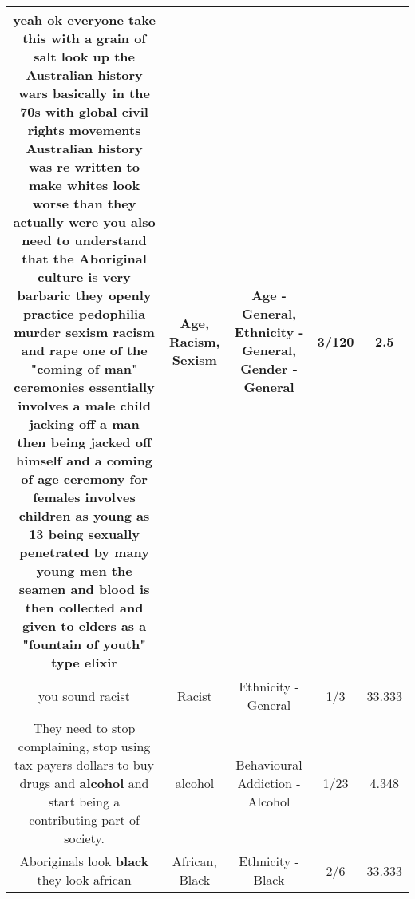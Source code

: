 \documentclass[11pt]{article}
\newlength\mylength
\begin{document}
\begin{center}
\begin{longtable}{|C{.65\mylength}|C{.30\mylength}|C{.12\mylength}|C{.12\mylength}|C{.12\mylength}|}
  \small yeah ok everyone take this with a grain of salt look up the Australian history wars basically in the 70s with global civil rights movements Australian history was re written to make whites look worse than they actually were you also need to understand that the Aboriginal culture is very barbaric they openly practice pedophilia murder \textbf{sexism} \textbf{racism} and rape one of the "coming of man" ceremonies essentially involves a male child jacking off a man then being jacked off himself and a coming of \textbf{age} ceremony for females involves children as young as 13 being sexually penetrated by many young men the seamen and blood is then collected and given to elders as a "fountain of youth" type elixir\normalsize   & Age, Racism, Sexism & Age - General, Ethnicity - General, Gender - General & 3/120 & 2.5 \\  \hline
  \small you sound racist\normalsize   & Racist & Ethnicity - General & 1/3 & 33.333 \\  \hline
  \small They need to stop complaining, stop using tax payers dollars to buy drugs and \textbf{alcohol} and start being a contributing part of society.\normalsize   & alcohol & Behavioural Addiction - Alcohol & 1/23 & 4.348 \\  \hline
  \small Aboriginals look \textbf{black} they look african\normalsize   & African, Black & Ethnicity - Black & 2/6 & 33.333 \\  \hline

\end{longtable}
\end{center}
\end{document}
